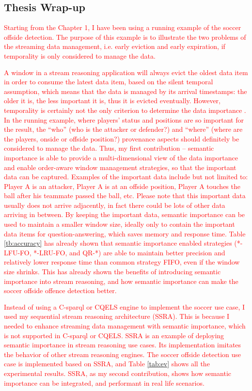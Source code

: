 \subsection{Thesis Wrap-up}
\textcolor{red}{
Starting from the Chapter 1, I have been using a running example of the soccer offside detection.
The purpose of this example is to illustrate the two problems of the streaming data management, i.e. early eviction and early expiration, if temporality is only considered to manage the data.
}

\textcolor{red}{
A window in a stream reasoning application will always evict the oldest data item in order to consume the latest data item, based on the silent temporal assumption, which means that the data is managed by its arrival timestamps: the older it is, the less important it is, thus it is evicted eventually. 
However, temporality is certainly not the only criterion to determine the data importance . 
In the running example, where players' status and positions are so important for the result, the ``who'' (who is
the attacker or defender?) and ``where'' (where are the players, onside or offside position?) provenance aspects should definitely be considered to manage the data. 
Thus, my first contribution -- semantic importance is able to provide a multi-dimensional view of the data importance and enable order-aware window management strategies, so that the important data can be captured.
Examples of the important data include but not limited to: Player A is an attacker, Player A is at an offside position, Player A touches the ball after his teammate passed the ball, etc. 
Please note that this important data usually does not arrive adjacently, in fact there could be lots of other data arriving in between.
By keeping the important data, semantic importance can be used to maintain a smaller window size, ideally only to contain the important data items for question-answering, which saves memory and response time.
Table \ref{tb:accuracy} has already shown that semantic importance enabled strategies (*-LFU-FO, *-LRU-FO, and QR-*) are able to maintain better precision and relatively lower response time than common strategy FIFO, even if the window size shrinks.
This has already shown the benefits of introducing semantic importance into stream reasoning, and how semantic importance can make the soccer offside offence detection better.
}

\textcolor{red}{
Instead of using a C-sparql or CQELS engine to implement the soccer use case, I used my sequential stream reasoning architecture (SSRA).
This is because I needed to enhance streaming data management with semantic importance, which is not supported in C-sparql or CQELS. 
SSRA is an example of deploying semantic importance in stream reasoning use cases. 
Its implementation imitates the behavior of other stream reasoning engines.
The soccer offside detection use case is implemented based on SSRA, and Table \ref{tab:ev} shows all the experimental results.
SSRA, as my second contribution, shows how semantic importance can be integrated, and performant in real life scenarios. 
}

